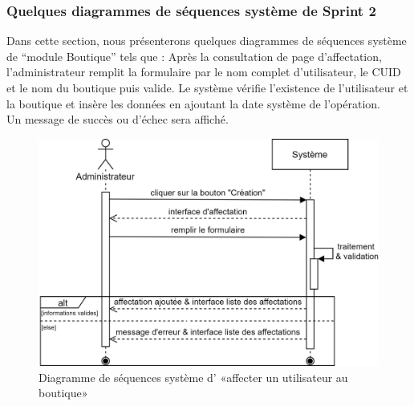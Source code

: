 \subsubsection[Quelques diagrammes de séquences système de Sprint 2]{Quelques diagrammes de séquences système de Sprint 2}
Dans cette section, nous présenterons quelques diagrammes de séquences système de “module Boutique” tels que : 
Après la consultation de page d'affectation, l'administrateur remplit la formulaire par le nom complet d'utilisateur, le CUID et le nom du boutique puis valide. Le système vérifie l'existence de l'utilisateur et la boutique et insère les données en ajoutant la date système de l'opération.\\
Un message de succès ou d'échec sera affiché.
\begin{figure}[H]
	\centering
	\includegraphics[width=0.7\linewidth]{"img/conception/sequences/sprint 2/affectation-system"}
	\caption[Diagramme de séquences système d’ «affecter un utilisateur au boutique»]{Diagramme de séquences système d’ «affecter un utilisateur au boutique»}
	\label{fig:affectation-system}
\end{figure}

